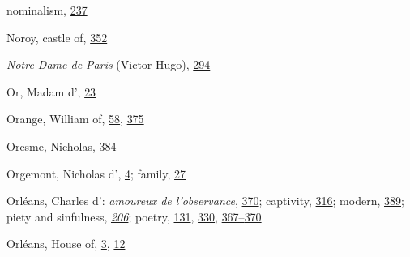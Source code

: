 nominalism,
\protect\hyperlink{16_Chapter_Nine__THE_DECLINE_OF_SYM.xhtmlux5cux23page_237}{237}

Noroy, castle of,
\protect\hyperlink{21_Chapter_Thirteen__IMAGE_AND_WORD.xhtmlux5cux23page_352}{352}

\emph{Notre Dame de Paris} (Victor Hugo),
\protect\hyperlink{19_Chapter_Twelve__ART_IN_LIFE.xhtmlux5cux23page_294}{294}

Or, Madam d',
\protect\hyperlink{08_Chapter_One__THE_PASSIONATE_INTE.xhtmlux5cux23page_23}{23}

Orange, William of,
\protect\hyperlink{09_Chapter_Two__THE_CRAVING_FOR_A_M.xhtmlux5cux23page_58}{58},
\protect\hyperlink{21_Chapter_Thirteen__IMAGE_AND_WORD.xhtmlux5cux23page_375}{375}

Oresme, Nicholas,
\protect\hyperlink{22_Chapter_Fourteen__THE_COMING_OF.xhtmlux5cux23page_384}{384}

Orgemont, Nicholas d',
\protect\hyperlink{08_Chapter_One__THE_PASSIONATE_INTE.xhtmlux5cux23page_4}{4};
family,
\protect\hyperlink{08_Chapter_One__THE_PASSIONATE_INTE.xhtmlux5cux23page_27}{27}

Orléans, Charles d': \emph{amoureux de l'observance},
\protect\hyperlink{21_Chapter_Thirteen__IMAGE_AND_WORD.xhtmlux5cux23page_370}{370};
captivity,
\protect\hyperlink{20_ILLUSTRATIONS_FOLLOW_PAGE.xhtmlux5cux23page_316}{316};
modern,
\protect\hyperlink{22_Chapter_Fourteen__THE_COMING_OF.xhtmlux5cux23page_389}{389};
piety and sinfulness,
\emph{\protect\hyperlink{14_Chapter_Seven__THE_PIOUS_PERSONA.xhtmlux5cux23page_206}{206}};
poetry,
\protect\hyperlink{11_Chapter_Four__THE_FORMS_OF_LOVE.xhtmlux5cux23page_131}{131},
\protect\hyperlink{21_Chapter_Thirteen__IMAGE_AND_WORD.xhtmlux5cux23page_330}{330},
\protect\hyperlink{21_Chapter_Thirteen__IMAGE_AND_WORD.xhtmlux5cux23page_367}{367--}\protect\hyperlink{21_Chapter_Thirteen__IMAGE_AND_WORD.xhtmlux5cux23page_370}{370}

Orléans, House of,
\protect\hyperlink{08_Chapter_One__THE_PASSIONATE_INTE.xhtmlux5cux23page_3}{3},
\protect\hyperlink{08_Chapter_One__THE_PASSIONATE_INTE.xhtmlux5cux23page_12}{12}

